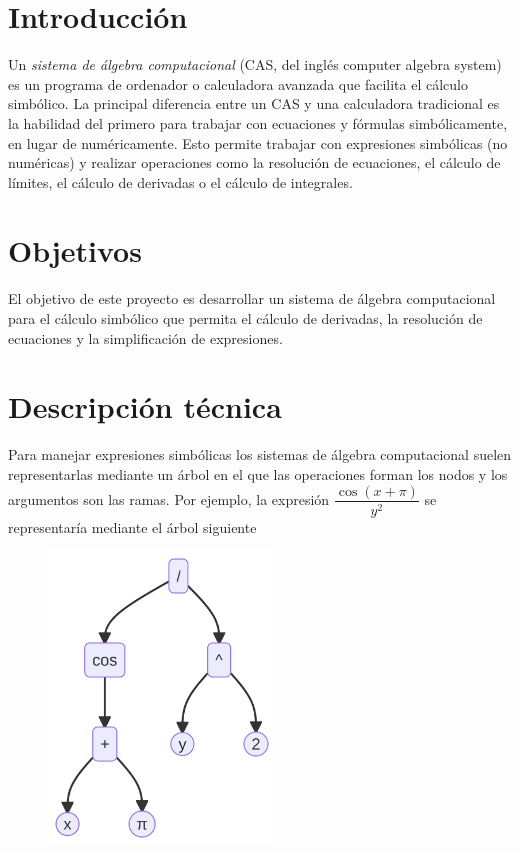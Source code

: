 \documentclass[
  a4paper,
]{scrreport}
\begin{document}
\hypertarget{introducciuxf3n}{%
\section{Introducción}\label{introducciuxf3n}}

Un \emph{sistema de álgebra computacional} (CAS, del inglés computer
algebra system) es un programa de ordenador o calculadora avanzada que
facilita el cálculo simbólico. La principal diferencia entre un CAS y
una calculadora tradicional es la habilidad del primero para trabajar
con ecuaciones y fórmulas simbólicamente, en lugar de numéricamente.
Esto permite trabajar con expresiones simbólicas (no numéricas) y
realizar operaciones como la resolución de ecuaciones, el cálculo de
límites, el cálculo de derivadas o el cálculo de integrales.

\hypertarget{objetivos}{%
\section{Objetivos}\label{objetivos}}

El objetivo de este proyecto es desarrollar un sistema de álgebra
computacional para el cálculo simbólico que permita el cálculo de
derivadas, la resolución de ecuaciones y la simplificación de
expresiones.

\hypertarget{descripciuxf3n-tuxe9cnica}{%
\section{Descripción técnica}\label{descripciuxf3n-tuxe9cnica}}

Para manejar expresiones simbólicas los sistemas de álgebra
computacional suelen representarlas mediante un árbol en el que las
operaciones forman los nodos y los argumentos son las ramas. Por
ejemplo, la expresión \(\dfrac{\cos(x+\pi)}{y^2}\) se representaría
mediante el árbol siguiente

\hypertarget{arbol-expresion}{}
\begin{figure}[H]

{\centering \includegraphics[width=2.37in,height=3.06in]{calculo-simbolico_files/figure-latex/mermaid-figure-1.png}

}

\end{figure}
\end{document}
